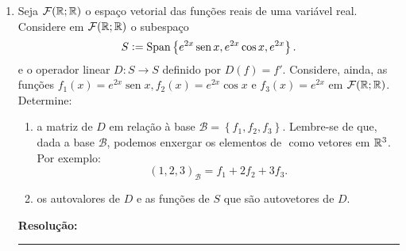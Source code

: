 \documentclass[leqno]{article}
\DeclareMathOperator{\vspan}{Span}
\DeclareMathOperator{\sen}{sen}
\numberwithin{equation}{section}
\newenvironment{sol} 
{
    \vspace{4mm}
    \noindent\textbf{Resolução:}
    \strut\newline
    \smallskip
    \hspace{-3.5mm} 
} 
{\noindent\rule{4cm}{.1mm}}
\begin{document}
\begin{enumerate}
\item Seja \( \mathcal{F} ( \mathbb{R}; \mathbb{R} ) \) o espaço vetorial das funções reais de uma variável real.
    Considere em \( \mathcal{F} ( \mathbb{R}; \mathbb{R} ) \) o subespaço
    \begin{equation*}
        S \defeq \vspan \left\{ e^{ 2x } \sen x, e^{ 2x } \cos x, e^{ 2x } \right\}
    .\end{equation*}
    e o operador linear \( D : S \to S \) definido por \( D ( f ) = f' \).
    Considere, ainda, as funções \( f_{ 1 } ( x ) = e^{ 2x } \sen x, f_{ 2 } ( x ) = e^{ 2x } \cos x \) e \( f_{ 3 } ( x ) = e^{ 2x } \) em \( \mathcal{F} ( \mathbb{R}; \mathbb{R} ) \).
    Determine:
    \begin{enumerate}[label=(\alph*)]
        \item a matriz de \( D \) em relação à base \( \mathcal{B} = \left\{ f_{ 1 }, f_{ 2 }, f_{ 3 } \right\} \).
            Lembre-se de que, dada a base \( \mathcal{B} \), podemos enxergar os elementos de \(  \) como vetores em \( \mathbb{R}^{ 3 } \).
            Por exemplo:
            \begin{equation*}
                ( 1, 2, 3 )_{ \mathcal{B} } = f_{ 1 } + 2f_{ 2 } + 3f_{ 3 }
            .\end{equation*}
        \item os autovalores de \( D \) e as funções de \( S \) que são autovetores de \( D \).
    \end{enumerate}

\begin{sol}

    
\end{sol}
\end{enumerate}
\end{document}
